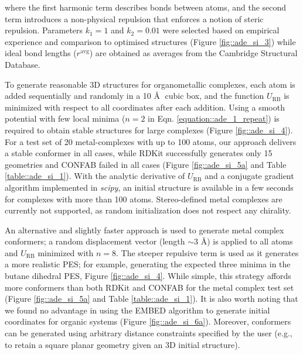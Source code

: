 \documentclass[../../main.tex]{subfiles}
\begin{document}
where the first harmonic term describes bonds between atoms, and the second term introduces a non-physical repulsion that enforces a notion of steric repulsion. Parameters $k_1 = 1$ and $k_2 = 0.01$ were selected based on empirical experience and comparison to optimised structures (Figure \ref{fig::ade_si_3}) while ideal bond lengths ($r^\text{avg}$) are obtained as averages from the Cambridge Structural Database.

To generate reasonable 3D structures for organometallic complexes, each atom is added sequentially and randomly in a 10 \AA$\;$ cubic box, and the function $U_\text{RB}$ is minimized with respect to all coordinates after each addition. Using a smooth potential with few local minima ($n = 2$ in Eqn. \eqref{equation::ade_1_repeat}) is required to obtain stable structures for large complexes (Figure \ref{fig::ade_si_4}). For a test set of 20 metal-complexes with up to 100 atoms, our approach delivers a stable conformer in all cases, while RDKit successfully generates only 15 geometries and CONFAB failed in all cases (Figure \ref{fig::ade_si_5a} and Table \ref{table::ade_si_1}). With the analytic derivative of $U_\text{RB}$ and a conjugate gradient algorithm implemented in \emph{scipy},\cite{SciPy} an initial structure is available in a few seconds for complexes with more than 100 atoms. Stereo-defined metal complexes are currently not supported, as random initialization does not respect any chirality.

An alternative and slightly faster approach is used to generate metal complex conformers; a random displacement vector (length $\sim3$ \AA) is applied to all atoms and $U_\text{RB}$ minimized with $n = 8$. The steeper repulsive term is used as it generates a more realistic PES; for example, generating the expected three minima in the butane dihedral PES, Figure \ref{fig::ade_si_4}. While simple, this strategy affords more conformers than both RDKit and CONFAB for the metal complex test set (Figure \ref{fig::ade_si_5a} and Table \ref{table::ade_si_1}). It is also worth noting that we found no advantage in using the EMBED algorithm\cite{Havel2002} to generate initial coordinates for organic systems (Figure \ref{fig::ade_si_6a}). Moreover, conformers can be generated using arbitrary distance constraints specified by the user (e.g., to retain a square planar geometry given an 3D initial structure).
\end{document}
